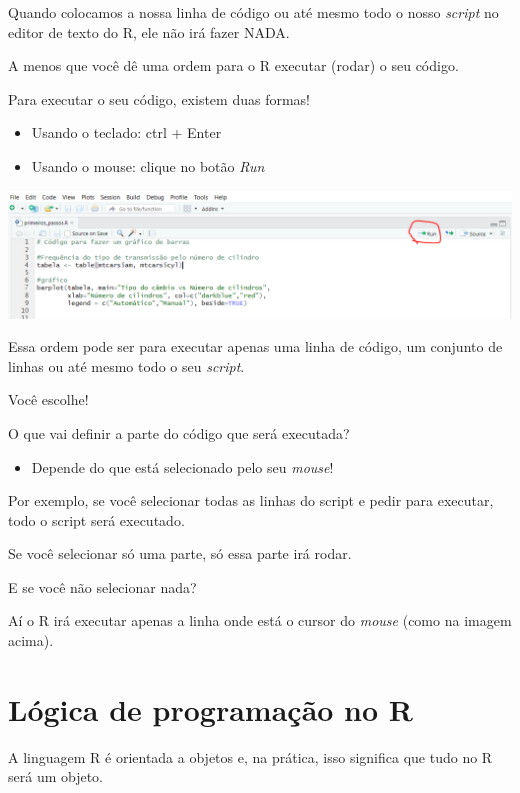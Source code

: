 \documentclass[
]{book}
\providecommand{\tightlist}{%
  \setlength{\itemsep}{0pt}\setlength{\parskip}{0pt}}
\begin{document}
Quando colocamos a nossa linha de código ou até mesmo todo o nosso
\emph{script} no editor de texto do R, ele não irá fazer NADA.

A menos que você dê uma ordem para o R executar (rodar) o seu código.

Para executar o seu código, existem duas formas!

\begin{itemize}
\item
  Usando o teclado: ctrl + Enter
\item
  Usando o mouse: clique no botão \emph{Run}
\end{itemize}

\includegraphics{imagens/3_run.png}

Essa ordem pode ser para executar apenas uma linha de código, um
conjunto de linhas ou até mesmo todo o seu \emph{script}.

Você escolhe!

O que vai definir a parte do código que será executada?

\begin{itemize}
\tightlist
\item
  Depende do que está selecionado pelo seu \emph{mouse}!
\end{itemize}

Por exemplo, se você selecionar todas as linhas do script e pedir para
executar, todo o script será executado.

Se você selecionar só uma parte, só essa parte irá rodar.

E se você não selecionar nada?

Aí o R irá executar apenas a linha onde está o cursor do \emph{mouse}
(como na imagem acima).

\hypertarget{luxf3gica-de-programauxe7uxe3o-no-r}{%
\section{Lógica de programação no
R}\label{luxf3gica-de-programauxe7uxe3o-no-r}}

A linguagem R é orientada a objetos e, na prática, isso significa que
tudo no R será um objeto.
\end{document}
